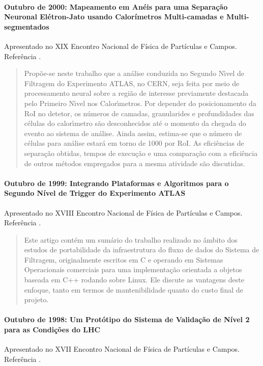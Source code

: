 \paragraph{Outubro de 2000: Mapeamento em An\'eis para uma Separa\c{c}\~ao
Neuronal El\'etron-Jato usando Calor\'imetros Multi-camadas e
Multi-segmentados} Apresentado no XIX Encontro Nacional de Física de
Partículas e Campos. Referência \cite{aa:enfpc-00}.

\begin{quotation}
Prop\~oe-se neste trabalho que a an\'alise conduzida no Segundo N\'{\i}vel de
Filtragem do Experimento ATLAS, no CERN, seja feita por meio de processamento
neural sobre a regi\~ao de interesse previamente destacada pelo Primeiro
N\'{\i}vel nos Calor\'{\i}metros. Por depender do posicionamento da RoI no
detetor, os números de camadas, granularides e profundidades das c\'elulas do
calor\'{\i}metro s\~ao desconhecidos at\'e o momento da chegada do evento ao
sistema de an\'alise. Ainda assim, estima-se que o n\'umero de c\'elulas para
an\'alise estar\'a em torno de 1000 por RoI.  As efici\^encias de
separa\c{c}\~ao obtidas, tempos de execu\c{c}\~ao e uma compara\c{c}\~ao com a
efici\^encia de outros m\'etodos empregados para a mesma atividade s\~ao
discutidas.
\end{quotation}

\paragraph{Outubro de 1999: Integrando Plataformas e Algoritmos para o Segundo
Nível de Trigger do Experimento ATLAS} Apresentado no XVIII Encontro 
Nacional de Física de Partículas e Campos. Referência \cite{aa:enfpc-99}.

\begin{quotation}
Este artigo contém um sumário do trabalho realizado no âmbito dos estudos de
portabilidade da infraestrutura do fluxo de dados do Sistema de Filtragem,
originalmente escritos em C e operando em Sistemas Operacionais comerciais
para uma implementação orientada a objetos baseada em C++ rodando sobre
Linux. Ele discute as vantagens deste enfoque, tanto em termos de
mantenibilidade quanto do custo final de projeto.
\end{quotation}

\paragraph{Outubro de 1998: Um Protótipo do Sistema de Validação de
Nível 2 para as Condições do LHC} Apresentado no XVII Encontro Nacional de
Física de Partículas e Campos. Referência \cite{aa:enfpc-98}.

